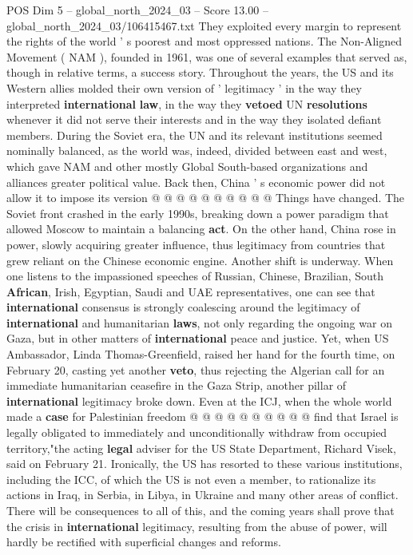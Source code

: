 \begin{textsample}{POS Dim 5 – global\_north\_2024\_03 – Score 13.00 – global\_north\_2024\_03/106415467.txt}
They exploited every margin to represent the rights of the world ' s poorest and most oppressed nations.
The Non-Aligned Movement ( NAM ), founded in 1961, was one of several examples that served as, though in relative terms, a success story.
Throughout the years, the US and its Western allies molded their own version of ' legitimacy ' in the way they interpreted \textbf{international} \textbf{law}, in the way they \textbf{vetoed} UN \textbf{resolutions} whenever it did not serve their interests and in the way they isolated defiant members.
During the Soviet era, the UN and its relevant institutions seemed nominally balanced, as the world was, indeed, divided between east and west, which gave NAM and other mostly Global South-based organizations and alliances greater political value.
Back then, China ' s economic power did not allow it to impose its version @ @ @ @ @ @ @ @ @ @ Things have changed.
The Soviet front crashed in the early 1990s, breaking down a power paradigm that allowed Moscow to maintain a balancing \textbf{act}.
On the other hand, China rose in power, slowly acquiring greater influence, thus legitimacy from countries that grew reliant on the Chinese economic engine.
Another shift is underway.
When one listens to the impassioned speeches of Russian, Chinese, Brazilian, South \textbf{African}, Irish, Egyptian, Saudi and UAE representatives, one can see that \textbf{international} consensus is strongly coalescing around the legitimacy of \textbf{international} and humanitarian \textbf{laws}, not only regarding the ongoing war on Gaza, but in other matters of \textbf{international} peace and justice.
Yet, when US Ambassador, Linda Thomas-Greenfield, raised her hand for the fourth time, on February 20, casting yet another \textbf{veto}, thus rejecting the Algerian call for an immediate humanitarian ceasefire in the Gaza Strip, another pillar of \textbf{international} legitimacy broke down.
Even at the ICJ, when the whole world made a \textbf{case} for Palestinian freedom @ @ @ @ @ @ @ @ @ @ find that Israel is legally obligated to immediately and unconditionally withdraw from occupied territory,"the acting \textbf{legal} adviser for the US State Department, Richard Visek, said on February 21.
Ironically, the US has resorted to these various institutions, including the ICC, of which the US is not even a member, to rationalize its actions in Iraq, in Serbia, in Libya, in Ukraine and many other areas of conflict.
There will be consequences to all of this, and the coming years shall prove that the crisis in \textbf{international} legitimacy, resulting from the abuse of power, will hardly be rectified with superficial changes and reforms.

\end{textsample}
